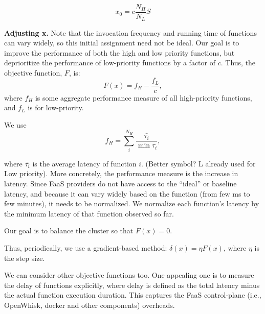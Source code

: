 \begin{equation} x_0 = c \frac{N_H}{N_L} S \end{equation}

\textbf{Adjusting x.}
Note that the invocation frequency and running time of functions can vary widely, so this initial assignment need not be ideal.
Our goal is to improve the performance of both the high and low priority functions, but deprioritize the performance of low-priority functions by a factor of $c$.
Thus, the objective function, $F$, is:
\begin{equation}
  F(x) = f_H - \frac{f_L}{c},
\end{equation}
where $f_H$ is some aggregate performance measure of all high-priority functions, and $f_L$ is for low-priority.

We use
\begin{equation}
f_H=\sum_i^{N_H} \frac{\bar{\tau_i}}{\min{\tau_i}},  
\end{equation}

where $\bar{\tau_i}$ is the average latency of function $i$. (Better symbol? L already used for Low priority). 
More concretely, the performance measure is the increase in latency. Since FaaS providers do not have access to the ``ideal'' or baseline latency, and because it can vary widely based on the function (from few ms to few minutes), it needs to be normalized. We normalize each function's latency by the minimum latency of that function observed so far. 

Our goal is to balance the cluster so that $F(x)=0$.

Thus, periodically, we use a gradient-based method: $\delta(x) = \eta F(x)$, where $\eta$ is the step size.

We can consider other objective functions too.
One appealing one is to measure the delay of functions explicitly, where delay is defined as the total latency minus the actual function execution duration. This captures the FaaS control-plane (i.e., OpenWhisk, docker and other components) overheads.



